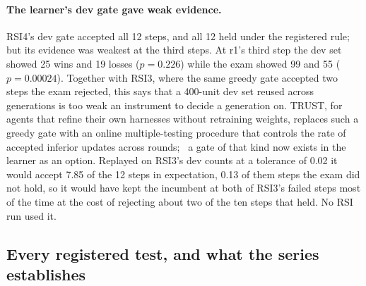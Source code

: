\paragraph{The learner's dev gate gave weak evidence.} RSI4's dev gate accepted all 12 steps, and
all 12 held under the registered rule; but its evidence was weakest at the third steps. At r1's third step
the dev set showed 25 wins and 19 losses ($p=0.226$) while the exam showed 99 and 55
($p=0.00024$). Together with RSI3, where the same greedy gate accepted two steps the exam
rejected, this says that a 400-unit dev set reused across generations is too weak an instrument to
decide a generation on. TRUST, for agents that refine their own harnesses without retraining weights, replaces such a
greedy gate with an online multiple-testing procedure that controls the rate of accepted inferior
updates across rounds;~\citep{trust2026} a gate of that kind now exists in the learner as an
option. Replayed on RSI3's dev counts at a tolerance of 0.02 it would accept 7.85 of the 12 steps in
expectation, 0.13 of them steps the exam did not hold, so it would have kept the incumbent at both of
RSI3's failed steps most of the time at the cost of rejecting about two of the ten steps that held. No RSI
run used it.

\subsection{Every registered test, and what the series establishes}\label{sec:rsi-scope}

